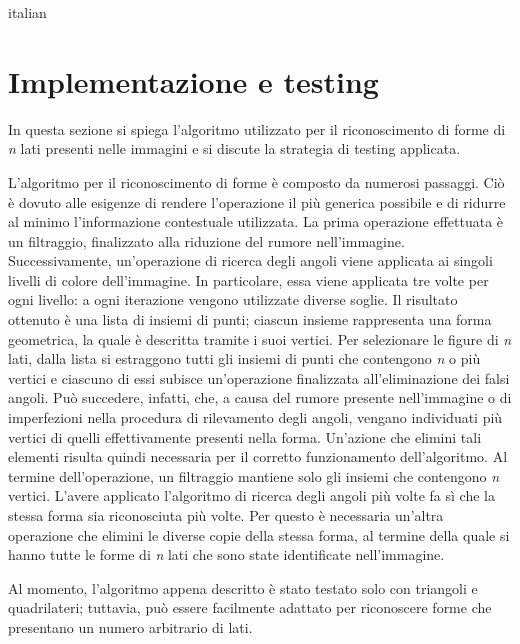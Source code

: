 \begin{otherlanguage*}{italian}
	\section*{Implementazione e testing}
		In questa sezione si spiega l'algoritmo utilizzato per il riconoscimento di forme di \emph{n} lati presenti nelle immagini e si discute la strategia di testing applicata.
		
		L'algoritmo per il riconoscimento di forme è composto da numerosi passaggi.
		Ciò è dovuto alle esigenze di rendere l'operazione il più generica possibile e di ridurre al minimo l'informazione contestuale utilizzata.
		La prima operazione effettuata è un filtraggio, finalizzato alla riduzione del rumore nell'immagine.
		Successivamente, un'operazione di ricerca degli angoli viene applicata ai singoli livelli di colore dell'immagine.
		In particolare, essa viene applicata tre volte per ogni livello: a ogni iterazione vengono utilizzate diverse soglie.
		Il risultato ottenuto è una lista di insiemi di punti; ciascun insieme rappresenta una forma geometrica, la quale è descritta tramite i suoi vertici.
		Per selezionare le figure di \emph{n} lati, dalla lista si estraggono tutti gli insiemi di punti che contengono \emph{n} o più vertici e ciascuno di essi subisce un'operazione finalizzata all'eliminazione dei falsi angoli.
		Può succedere, infatti, che, a causa del rumore presente nell'immagine o di imperfezioni nella procedura di rilevamento degli angoli, vengano individuati più vertici di quelli effettivamente presenti nella forma.
		Un'azione che elimini tali elementi risulta quindi necessaria per il corretto funzionamento dell'algoritmo.
		Al termine dell'operazione, un filtraggio mantiene solo gli insiemi che contengono \emph{n} vertici.
		L'avere applicato l'algoritmo di ricerca degli angoli più volte fa sì che la stessa forma sia riconosciuta più volte.	
		Per questo è necessaria un'altra operazione che elimini le diverse copie della stessa forma, al termine della quale si hanno tutte le forme di \emph{n} lati che sono state identificate nell'immagine. 

		Al momento, l'algoritmo appena descritto è stato testato solo con triangoli e quadrilateri; tuttavia, può essere facilmente adattato per riconoscere forme che presentano un numero arbitrario di lati. 
		

\end{otherlanguage*}
